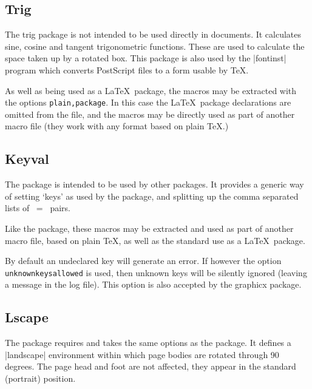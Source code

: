 \subsection{Trig}
The trig package is not intended to be used directly in documents. It
calculates sine, cosine and tangent trigonometric functions. These
are used to calculate the space taken up by a rotated box. This
package is also used by the |fontinst| program which converts
PostScript files to a form usable by \TeX.

As well as being used as a \LaTeX\ package, the macros may be extracted
with the  options \texttt{plain,package}. In this case
the \LaTeX\ package declarations are omitted from the file, and the
macros may be directly used as part of another macro file (they work
with any format based on plain \TeX.)

\subsection{Keyval}
The  package is intended to be used by other
packages. It provides a generic way of setting `keys' as used by the
 package, and splitting up the comma separated lists
of ~=~ pairs.

Like the  package, these macros may be extracted and used
as part of another macro file, based on plain \TeX, as well as the
standard use as a \LaTeX\ package.

By default an undeclared key will generate an error.
If however the option  \texttt{unknownkeysallowed} is used, then
unknown keys will be silently ignored (leaving a message in the log
file). This option is also accepted by the \textsf{graphicx} package.

\iffalse

\subsection{Pstcol}
\package{PSTricks}, by Timothy Van Zandt is an immensely powerful
package that enables a very full featured interface between PostScript
and \TeX. Unfortunately the colour support in \package{PSTricks} is
slightly incompatible with the colour mechanism defined in the
\package{color} package. The \package{pstcol} package is a (hopefully
temporary) package that modifies a very small number of internal
PSTricks functions, to remove this incompatibility. If
\package{pstricks} is loaded via this package, you may use any colours
defined by \package{color} package commands within \package{pstricks}
commands, and vice versa.

\fi

\subsection{Lscape}
The  package requires and takes the same options
as the  package. It defines a |landscape| environment
within which page bodies are rotated through 90 degrees. The page head
and foot are not affected, they appear in the standard (portrait)
position.

